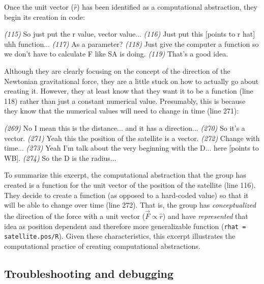 \documentclass{msuphddissertation}
\begin{document}
\begin{doublespace}
Once the unit vector ($\hat{r}$) has been identified as a computational abstraction, they begin its creation in code:\begin{description}
\SD \textit{(115)} So just put the r value, vector value...
\SD \textit{(116)} Just put this [points to r hat] uhh function...
\SB \textit{(117)} As a parameter?			
\SD \textit{(118)} Just give the computer a function so we don't have to calculate F {like SA is doing}.	
\SB \textit{(119)} That's a good idea.
\end{description} Although they are clearly focusing on the concept of the direction of the Newtonian gravitational force, they are a little stuck on how to actually go about creating it.  However, they at least know that they want it to be a function (line 118) rather than just a constant numerical value.  Presumably, this is because they know that the numerical values will need to change in time (line 271):\begin{description}
\SD \textit{(269)} No I mean this is the distance... and it has a direction...	
\SB \textit{(270)} So it's a vector.
\SD \textit{(271)} Yeah this {the position of the satellite} is a vector.
\SD \textit{(272)} Change with time...
\SC \textit{(273)} Yeah I'm talk about the very beginning with the D... here [points to WB].
\SB \textit{(274)} So the D is the radius...
\end{description}

To summarize this excerpt, the computational abstraction that the group has created is a function for the unit vector of the position of the satellite (line 116).  They decide to create a function (as opposed to a hard-coded value) so that it will be able to change over time (line 272).  That is, the group has \textit{conceptualized} the direction of the force with a unit vector ($\vec{F}\propto\hat{r}$) and have \textit{represented} that idea as position dependent and therefore more generalizable function (\texttt{rhat = satellite.pos/R}).  Given these characteristics, this excerpt illustrates the computational practice of creating computational abstractions.

%
%
%
%
%
%
%
%
%
%
%
%
%
%
%
%

\subsection{Troubleshooting and debugging}


\end{doublespace}
\end{document}
